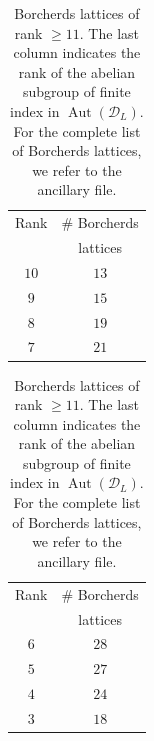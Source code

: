 \documentclass[11pt,letterpaper]{amsart}
\DeclareMathOperator{\Aut}{Aut}
\begin{document}
\begin{table}
\vspace{10pt}
\begin{tabular}{ c | c } 
  Rank & \# Borcherds\\ & lattices \\
  \hline
$10$ &$13$\\
$9$ &$15$\\
$8$ &$19$\\
$7$ &$21$\\

\end{tabular}
\quad 
\begin{tabular}{ c | c } 
  Rank & \# Borcherds\\ & lattices \\
  \hline
$6$ &$28$\\
$5$ &$27$\\
$4$ &$24$\\
$3$ &$18$\\

\end{tabular}
\caption{Borcherds lattices of rank $ \ge 11$. The last column indicates the rank of the abelian subgroup of finite index in $\Aut(\mathcal{D}_L)$. For the complete list of Borcherds lattices, we refer to the ancillary file.}
\label{tab:Borcherds.lattices.11}
\end{table}


\normalsize

\printbibliography
\end{document}
